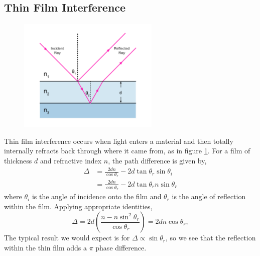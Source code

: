\documentclass{book}
\begin{document}
{\subsection{Thin Film Interference}
\begin{figure}[h]
	\centering
	\includegraphics[width=0.6\textwidth]{thinfilm.jpg}
	\caption{}
	\label{fig:thin film}
\end{figure}
Thin film interference occurs when light enters a material and then totally internally refracts back through where it came from, as in figure \ref{fig:thin film}. For a film of thickness $d$ and refractive index $n$, the path difference is given by,
\begin{equation}
	\begin{split}
		\Delta & = \frac{2dn}{\cos\theta_r} - 2d\tan\theta_r\sin\theta_i \\
			& = \frac{2dn}{\cos\theta_r} - 2d\tan\theta_rn\sin\theta_r
	\end{split}
\end{equation}
where $\theta_i$ is the angle of incidence onto the film and $\theta_r$ is the angle of reflection within the film. Applying appropriate identities, 
\begin{equation}
	\Delta = 2d\left(\frac{n-n\sin^2\theta_r}{\cos\theta_r}\right) = \boxed{2dn\cos\theta_r},
\end{equation}
The typical result we would expect is for $\Delta \propto \sin\theta_r$, so we see that the reflection within the thin film adds a $\pi$ phase difference. 
}
\end{document}

